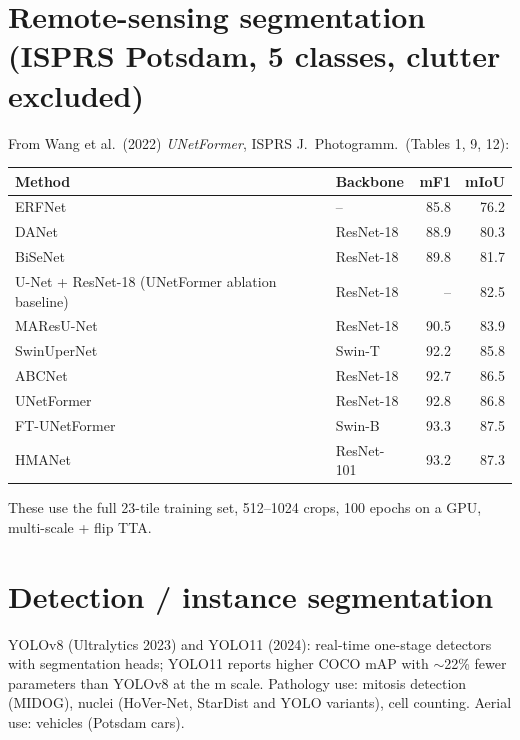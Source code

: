 \section{Remote-sensing segmentation (ISPRS Potsdam, 5 classes, clutter excluded)}
From Wang et al.\ (2022) \emph{UNetFormer}, ISPRS J.\ Photogramm.\ (Tables 1, 9, 12):
\begin{longtable}{p{6cm}p{3cm}rr}\toprule
\textbf{Method} & \textbf{Backbone} & \textbf{mF1} & \textbf{mIoU}\\\midrule
ERFNet & -- & 85.8 & 76.2\\
DANet & ResNet-18 & 88.9 & 80.3\\
BiSeNet & ResNet-18 & 89.8 & 81.7\\
U-Net + ResNet-18 (UNetFormer ablation baseline) & ResNet-18 & -- & 82.5\\
MAResU-Net & ResNet-18 & 90.5 & 83.9\\
SwinUperNet & Swin-T & 92.2 & 85.8\\
ABCNet & ResNet-18 & 92.7 & 86.5\\
UNetFormer & ResNet-18 & 92.8 & 86.8\\
FT-UNetFormer & Swin-B & 93.3 & 87.5\\
HMANet & ResNet-101 & 93.2 & 87.3\\
\bottomrule\end{longtable}
These use the full 23-tile training set, 512--1024 crops, 100 epochs on a GPU, multi-scale + flip TTA.

\section{Detection / instance segmentation}
YOLOv8 (Ultralytics 2023) and YOLO11 (2024): real-time one-stage detectors with segmentation heads; YOLO11 reports
higher COCO mAP with $\sim$22\% fewer parameters than YOLOv8 at the m scale. Pathology use: mitosis detection (MIDOG),
nuclei (HoVer-Net, StarDist and YOLO variants), cell counting. Aerial use: vehicles (Potsdam cars).


